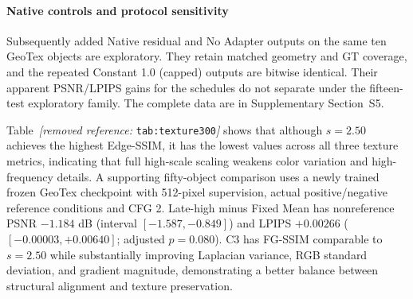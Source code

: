\documentclass[times,twocolumn,final]{elsarticle}
\providecommand{\DIFadd}[1]{{\protect\color{blue} \sf #1}} %
\providecommand{\DIFdel}[1]{{\protect\color{red} \scriptsize #1}} %
\providecommand{\DIFaddbegin}{} %
\providecommand{\DIFaddend}{} %
\providecommand{\DIFdelbegin}{} %
\providecommand{\DIFdelend}{} %
\begin{document}
\DIFdelbegin %
\DIFdelend \DIFaddbegin \paragraph{Native controls and protocol sensitivity}
\DIFadd{Subsequently added Native residual and No Adapter outputs on the same ten GeoTex objects are exploratory. They retain matched geometry and GT coverage, and the repeated Constant 1.0 (capped) outputs are bitwise identical. Their apparent PSNR/LPIPS gains for the schedules do not separate under the fifteen-test exploratory family. The complete data are in Supplementary Section~S5.
}\DIFaddend

\DIFdelbegin \DIFdel{Table~\textit{[removed reference: }\texttt{tab:texture300}\textit{]} shows that although $s = 2.50$ achieves the highest Edge-SSIM, it has the lowest values across all three texture metrics, indicating that full high-scale scaling weakens color variation and high-frequency details. }\DIFdelend \DIFaddbegin \DIFadd{A supporting fifty-object comparison uses a newly trained frozen GeoTex checkpoint with 512-pixel supervision, actual positive/negative reference conditions and CFG 2. Late-high minus Fixed Mean has nonreference PSNR $-1.184$ dB (interval $[-1.587,-0.849]$) and LPIPS $+0.00266$ ($[-0.00003,+0.00640]$; adjusted $p=0.080$). }\DIFaddend C3 has \DIFdelbegin \DIFdel{FG-SSIM comparable to $s = 2.50$ while substantially improving Laplacian variance, RGB standard deviation, and gradient magnitude, demonstrating a better balance between structural alignment and texture preservation. }%
\end{document}
